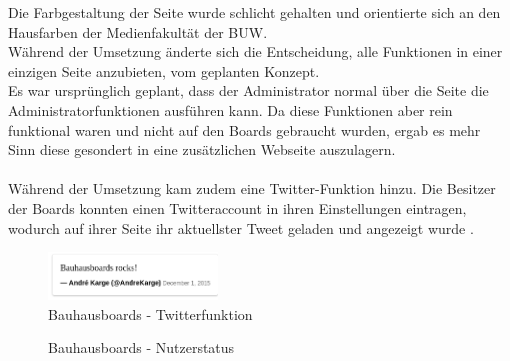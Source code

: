 Die Farbgestaltung der Seite wurde schlicht gehalten und orientierte sich an den Hausfarben der Medienfakultät der BUW.
\\
Während der Umsetzung änderte sich die Entscheidung, alle Funktionen in einer einzigen Seite anzubieten, vom geplanten Konzept.
\\
Es war ursprünglich geplant, dass der Administrator normal über die Seite die Administratorfunktionen ausführen kann. Da diese Funktionen aber rein funktional waren und nicht auf den Boards gebraucht wurden, ergab es mehr Sinn diese gesondert in eine zusätzlichen Webseite auszulagern.
\\
\\
Während der Umsetzung kam zudem eine Twitter-Funktion hinzu. Die Besitzer der Boards konnten einen Twitteraccount in ihren Einstellungen eintragen, wodurch auf ihrer Seite ihr aktuellster Tweet geladen und angezeigt wurde .
\begin{figure}[h!]
  \centering
    \includegraphics[width=0.4\textwidth]{./img/TwitterFeature.png}
  \caption{Bauhausboards - Twitterfunktion}
  \label{img:twitter}
\end{figure}
\begin{figure}
  \centering
  \caption{Bauhausboards - Nutzerstatus}
  \label{img:UserAvailable}
\end{figure}
